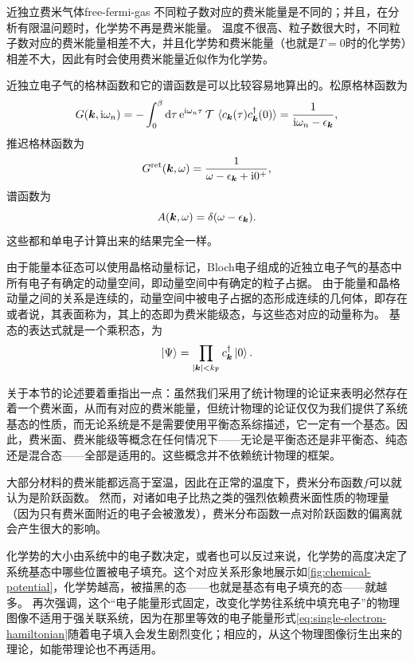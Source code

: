 \begin{back}{近独立费米气体}{free-fermi-gas}
    不同粒子数对应的费米能量是不同的；并且，在分析有限温问题时，化学势不再是费米能量。
    温度不很高、粒子数很大时，不同粒子数对应的费米能量相差不大，并且化学势和费米能量（也就是$T=0$时的化学势）相差不大，因此有时会使用费米能量近似作为化学势。

    近独立电子气的格林函数和它的谱函数是可以比较容易地算出的。松原格林函数为
    \begin{equation}
        G(\vb*{k}, \mathrm{i} \omega_n) = - \int_0^\beta \dd{\tau} \mathrm{e}^{\mathrm{i} \omega_n \tau} \operatorname{\mathcal{T}} \expval*{c_{\vb*{k}}(\tau) c_{\vb*{k}}^\dagger(0)} = \frac{1}{\mathrm{i} \omega_n - \epsilon_{\vb*{k}}},
    \end{equation}
    推迟格林函数为
    \begin{equation}
        G^\text{ret}(\vb*{k}, \omega) = \frac{1}{\omega - \epsilon_{\vb*{k}} + \mathrm{i} 0^+},
    \end{equation}
    谱函数为
    \begin{equation}
        A(\vb*{k}, \omega) = \delta(\omega - \epsilon_{\vb*{k}}).
    \end{equation}
    这些都和单电子计算出来的结果完全一样。
\end{back}

由于能量本征态可以使用晶格动量标记，Bloch电子组成的近独立电子气的基态中所有电子有确定的动量空间，即动量空间中有确定的粒子占据。
由于能量和晶格动量之间的关系是连续的，动量空间中被电子占据的态形成连续的几何体，即存在或者说，其表面称为，其上的态即为费米能级态，与这些态对应的动量称为。
基态的表达式就是一个乘积态，为
\begin{equation}
    \ket{\Psi} = \prod_{\abs{\vb*{k}} < k_\text{F}} {c}^\dagger_{\vb*{k}} \ket{0}.
    \label{eq:ground-state}
\end{equation}

关于本节的论述要着重指出一点：虽然我们采用了统计物理的论证来表明必然存在着一个费米面，从而有对应的费米能量，但统计物理的论证仅仅为我们提供了系统基态的性质，而无论系统是不是需要使用平衡态系综描述，它一定有一个基态。因此，费米面、费米能级等概念在任何情况下——无论是平衡态还是非平衡态、纯态还是混合态——全部是适用的。这些概念并不依赖统计物理的框架。

大部分材料的费米能都远高于室温，因此在正常的温度下，费米分布函数$f$可以就认为是阶跃函数。
然而，对诸如电子比热之类的强烈依赖费米面性质的物理量（因为只有费米面附近的电子会被激发），费米分布函数一点对阶跃函数的偏离就会产生很大的影响。

化学势的大小由系统中的电子数决定，或者也可以反过来说，化学势的高度决定了系统基态中哪些位置被电子填充。这个对应关系形象地展示如\autoref{fig:chemical-potential}，化学势越高，被描黑的态——也就是基态有电子填充的态——就越多。
再次强调，这个“电子能量形式固定，改变化学势往系统中填充电子”的物理图像不适用于强关联系统，因为在那里等效的电子能量形式\eqref{eq:single-electron-hamiltonian}随着电子填入会发生剧烈变化；相应的，从这个物理图像衍生出来的理论，如能带理论也不再适用。

